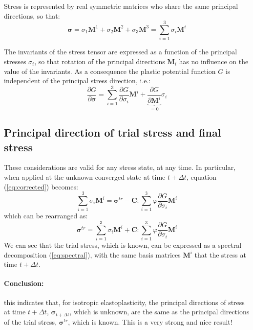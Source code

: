 \documentclass[letterpaper,12pt]{article}
\begin{document}
Stress is represented by real symmetric matrices who share the same principal directions, so that:
\begin{equation}
\boldsymbol{\sigma}  = \sigma_1 \mathbf{M}^1 + \sigma_2 \mathbf{M}^2 + \sigma_3 \mathbf{M}^3 = \sum_{i=1}^{3} \sigma_i \mathbf{M}^i
\end{equation}

The invariants of the stress tensor are expressed as a function of the principal stresses $\sigma_i$, so that rotation of the principal directions $\mathbf{M}_i$ has no influence on the value of the invariants. As a consequence the plastic potential function $G$ is independent of the principal stress direction, i.e.:
\begin{equation}
\frac{\partial G}{\partial \boldsymbol{\sigma}} = \sum_{i=1}^3 \frac{\partial G}{\partial \sigma_i} \mathbf{M}^i + \underbrace{\frac{\partial G}{\partial \mathbf{M}^i}}_{=0} \sigma_i
\end{equation}

\subsection{Principal direction of trial stress and final stress}
These considerations are valid for any stress state, at any time. In particular, when applied at the unknown converged state at time $t+\Delta t$, equation (\ref{eq:corrected}) becomes:
\begin{equation}
\sum_{i=1}^{3} \sigma_i \mathbf{M}^i = \boldsymbol{\sigma}^{tr} - \boldsymbol{C}:\sum_{i=1}^3 \varphi\frac{\partial G}{\partial \sigma_i} \mathbf{M}^i
\end{equation}
which can be rearranged as:
\begin{equation}
\boldsymbol{\sigma}^{tr} = \sum_{i=1}^{3} \sigma_i \mathbf{M}^i + \boldsymbol{C}:\sum_{i=1}^3 \varphi\frac{\partial G}{\partial \sigma_i} \mathbf{M}^i
\end{equation}
We can see that the trial stress, which is known, can be expressed as a spectral decomposition (\ref{eq:spectral}), with the same basis matrices $\mathbf{M}^i$ that the stress at time $t+\Delta t$.

\paragraph{Conclusion:} this indicates that, for isotropic elastoplasticity, the principal directions of stress at time $t+\Delta t$, $\boldsymbol{\sigma}_{t+\Delta t}$, which is unknown, are the same as the principal directions of the trial stress, $\boldsymbol{\sigma}^{tr}$, which is known. This is a very strong and nice result!
\end{document}
